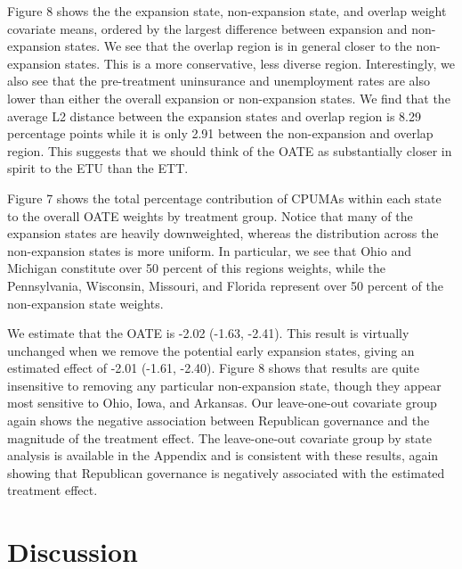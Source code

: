 \documentclass[12pt]{article}
\begin{document}
Figure 8 shows the the expansion state, non-expansion state, and overlap weight covariate means, ordered by the largest difference between expansion and non-expansion states. We see that the overlap region is in general closer to the non-expansion states. This is a more conservative, less diverse region. Interestingly, we also see that the pre-treatment uninsurance and unemployment rates are also lower than either the overall expansion or non-expansion states. We find that the average L2 distance between the expansion states and overlap region is 8.29 percentage points while it is only 2.91 between the non-expansion and overlap region. This suggests that we should think of the OATE as substantially closer in spirit to the ETU than the ETT.

Figure 7 shows the total percentage contribution of CPUMAs within each state to the overall OATE weights by treatment group. Notice that many of the expansion states are heavily downweighted, whereas the distribution across the non-expansion states is more uniform. In particular, we see that Ohio and Michigan constitute over 50 percent of this regions weights, while the Pennsylvania, Wisconsin, Missouri, and Florida represent over 50 percent of the non-expansion state weights.


We estimate that the OATE is -2.02 (-1.63, -2.41). This result is virtually unchanged when we remove the potential early expansion states, giving an estimated effect of -2.01 (-1.61, -2.40). Figure 8 shows that results are quite insensitive to removing any particular non-expansion state, though they appear most sensitive to Ohio, Iowa, and Arkansas. Our leave-one-out covariate group again shows the negative association between Republican governance and the magnitude of the treatment effect. The leave-one-out covariate group by state analysis is available in the Appendix and is consistent with these results, again showing that Republican governance is negatively associated with the estimated treatment effect.


\section{Discussion}
\end{document}
